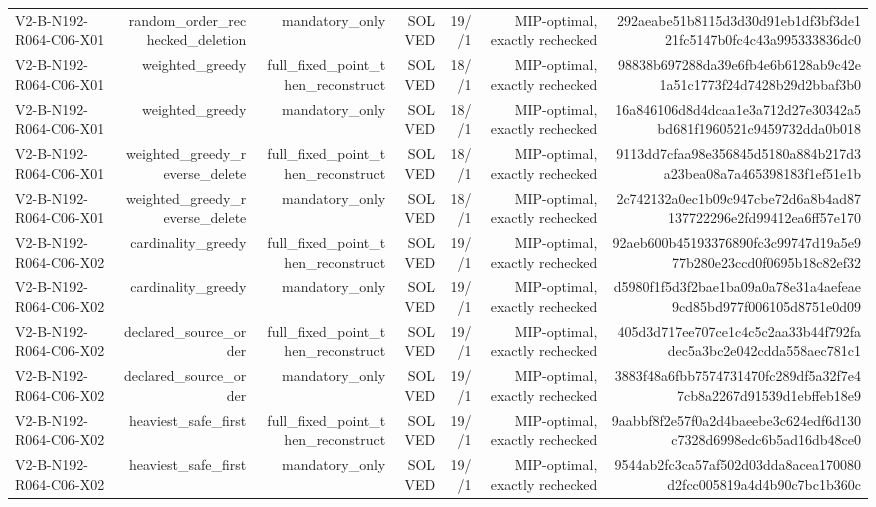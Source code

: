 {\begin{longtable}{lrrrrrr}
V2-B-N192-R064-C06-X01 & random\_order\_rechecked\_deletion & mandatory\_only & SOLVED & 19//1 & MIP-optimal, exactly rechecked & 292aeabe51b8115d3d30d91eb1df3bf3de121fc5147b0fc4c43a995333836dc0 \\
V2-B-N192-R064-C06-X01 & weighted\_greedy & full\_fixed\_point\_then\_reconstruct & SOLVED & 18//1 & MIP-optimal, exactly rechecked & 98838b697288da39e6fb4e6b6128ab9c42e1a51c1773f24d7428b29d2bbaf3b0 \\
V2-B-N192-R064-C06-X01 & weighted\_greedy & mandatory\_only & SOLVED & 18//1 & MIP-optimal, exactly rechecked & 16a846106d8d4dcaa1e3a712d27e30342a5bd681f1960521c9459732dda0b018 \\
V2-B-N192-R064-C06-X01 & weighted\_greedy\_reverse\_delete & full\_fixed\_point\_then\_reconstruct & SOLVED & 18//1 & MIP-optimal, exactly rechecked & 9113dd7cfaa98e356845d5180a884b217d3a23bea08a7a465398183f1ef51e1b \\
V2-B-N192-R064-C06-X01 & weighted\_greedy\_reverse\_delete & mandatory\_only & SOLVED & 18//1 & MIP-optimal, exactly rechecked & 2c742132a0ec1b09c947cbe72d6a8b4ad87137722296e2fd99412ea6ff57e170 \\
V2-B-N192-R064-C06-X02 & cardinality\_greedy & full\_fixed\_point\_then\_reconstruct & SOLVED & 19//1 & MIP-optimal, exactly rechecked & 92aeb600b45193376890fc3c99747d19a5e977b280e23ccd0f0695b18c82ef32 \\
V2-B-N192-R064-C06-X02 & cardinality\_greedy & mandatory\_only & SOLVED & 19//1 & MIP-optimal, exactly rechecked & d5980f1f5d3f2bae1ba09a0a78e31a4aefeae9cd85bd977f006105d8751e0d09 \\
V2-B-N192-R064-C06-X02 & declared\_source\_order & full\_fixed\_point\_then\_reconstruct & SOLVED & 19//1 & MIP-optimal, exactly rechecked & 405d3d717ee707ce1c4c5c2aa33b44f792fadec5a3bc2e042cdda558aec781c1 \\
V2-B-N192-R064-C06-X02 & declared\_source\_order & mandatory\_only & SOLVED & 19//1 & MIP-optimal, exactly rechecked & 3883f48a6fbb7574731470fc289df5a32f7e47cb8a2267d91539d1ebffeb18e9 \\
V2-B-N192-R064-C06-X02 & heaviest\_safe\_first & full\_fixed\_point\_then\_reconstruct & SOLVED & 19//1 & MIP-optimal, exactly rechecked & 9aabbf8f2e57f0a2d4baeebe3c624edf6d130c7328d6998edc6b5ad16db48ce0 \\
V2-B-N192-R064-C06-X02 & heaviest\_safe\_first & mandatory\_only & SOLVED & 19//1 & MIP-optimal, exactly rechecked & 9544ab2fc3ca57af502d03dda8acea170080d2fcc005819a4d4b90c7bc1b360c \\

\end{longtable}}
